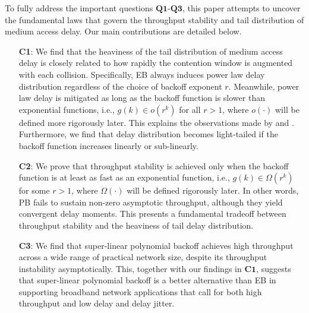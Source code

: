 \documentclass[journal]{IEEEtran}
\begin{document}
To fully address the important questions $\textbf{Q1-Q3}$, this paper attempts to uncover the fundamental laws that govern the throughput stability and tail distribution of medium access delay. Our main contributions are detailed below.
\begin{itemize}
  \item[\textbf{C1}:] We find that the heaviness of the tail distribution of medium access delay is closely related to how rapidly the contention window is augmented with each collision. Specifically, EB always induces power law delay distribution regardless of the choice of backoff exponent $r$. Meanwhile, power law delay is mitigated as long as the backoff function is slower than exponential functions, i.e., $g(k)\in o\left(r^k\right)$ for all $r>1$, where $o\left(\cdot\right)$ will be defined more rigorously later. This explains the observations made by \cite{2008:Xu} and \cite{2011:Sun}. Furthermore, we find that delay distribution becomes light-tailed if the backoff function increases linearly or sub-linearly.
  \item[\textbf{C2}:] We prove that throughput stability is achieved only when the backoff function is at least as fast as an exponential function, i.e., $g(k)\in\Omega\left(r^k\right)$ for some $r>1$, where $\Omega(\cdot)$ will be defined rigorously later. In other words, PB fails to sustain non-zero asymptotic throughput, although they yield convergent delay moments. This presents a fundamental tradeoff between throughput stability and the heaviness of tail delay distribution.
  \item[\textbf{C3}:] We find that super-linear polynomial backoff achieves high throughput across a wide range of practical network size, despite its throughput instability asymptotically. This, together with our findings in $\textbf{C1}$, suggests that super-linear polynomial backoff is a better alternative than EB in supporting broadband network applications that call for both high throughput and low delay and delay jitter.
  \end{itemize}
\end{document}
